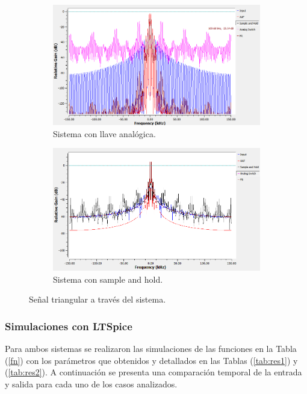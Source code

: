 \begin{figure}[H]
		\begin{subfigure}{.5\textwidth}
	\centering
	\includegraphics[width=\textwidth]{SimulacionesGNURADIO/Condiciones_optimas/TRIANGULAR_FFT_LLAVE_BC.PNG}
	\caption{Sistema con llave analógica.}		
	\end{subfigure}
	\begin{subfigure}{.5\textwidth}
	\centering
	\includegraphics[width=\textwidth]{SimulacionesGNURADIO/Condiciones_optimas/TRIANGULAR_FFT_SAMPLE_AND_HOLD_BC.PNG}
	\caption{Sistema con sample and hold.}		
	\end{subfigure}
	
	\caption{Señal triangular a través del sistema.}
\end{figure}


\subsubsection{Simulaciones con LTSpice}
Para ambos sistemas se realizaron las simulaciones de las funciones en la Tabla (\ref{fn}) con los parámetros que obtenidos y detallados en las Tablas (\ref{tab:res1}) y (\ref{tab:res2}). A continuación se presenta una comparación temporal de la entrada y salida para cada uno de los casos analizados.


